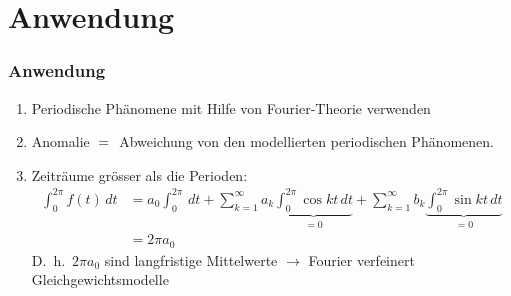 \section{Anwendung}
%
% 
%
\begin{frame}
\frametitle{Anwendung}
\begin{enumerate}[<+->]
\item
Periodische Phänomene mit Hilfe von Fourier-Theorie verwenden
\item
Anomalie $\mathstrut = \mathstrut$ Abweichung von den modellierten
periodischen Phänomenen.
\item
Zeiträume grösser als die Perioden:
\begin{align*}
\int_0^{2\pi}
f(t)\,dt
&=
a_0\int_0^{2\pi} \,dt
+
\sum_{k=1}^\infty a_k\underbrace{\int_0^{2\pi}\cos kt\,dt}_{\displaystyle=0}
+
\sum_{k=1}^\infty b_k\underbrace{\int_0^{2\pi}\sin kt\,dt}_{\displaystyle=0}
\\
&=
2\pi a_0
\end{align*}
D.~h.~$2\pi a_0$ sind langfristige Mittelwerte
$\rightarrow$ Fourier verfeinert Gleichgewichtsmodelle
\end{enumerate}
\end{frame}


